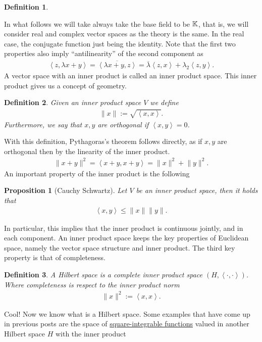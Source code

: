 \documentclass[12pt]{article}
\newtheorem{proposition}{Proposition}
\newtheorem{definition}{Definition}
\newcommand{\br}[1]{\left\langle#1\right\rangle} \newcommand{\set}[1]{\left\{#1\right\}}\newcommand{\qt}[1]{\left(#1\right)} \newcommand{\qp}[1]{\left(#1\right)}\newcommand{\qb}[1]{\left[#1\right]}
\renewcommand{\norm}[1]{\lVert #1 \rVert}\renewcommand{\abs}[1]{\left| #1 \right|}
\begin{document}
\begin{CJK*}{UTF8}{gbsn}
\begin{definition}
	\end{definition}

	In what follows we will take always take the base field to be $\mathbb{K}$, that is, we will consider real and complex vector spaces as the theory is the same. In the real case, the conjugate
	function just being the identity. Note that the first two properties also imply  ``antilinearity'' of the second component as
	\begin{align*}
		\br{z,\lambda x+  y}=\overline{\br{\lambda  x+ y,z}}= \overline{\lambda }\br{z,x}+ \lambda _2\br{z,y}.
	\end{align*}
	A vector space with an inner product is called an inner product space. This inner product gives us a concept of geometry.
	\begin{definition}
		Given an inner product space $V$ we define
		\begin{align*}
			\norm{x}:= \sqrt{\br{x,x}}.
		\end{align*}
		Furthermore, we say that $x,y$ are orthogonal if $\br{x,y}=0$.
	\end{definition}
	With this definition, Pythagoras's theorem follows directly, as if $x,y$ are orthogonal then by the linearity of the inner product.
	\begin{align*}
		\norm{x+y}^2 = \br{x+y,x+y}= \norm{x}^2 +\norm{y}^2.
	\end{align*}
	An important property of the inner product is the following\begin{proposition}[Cauchy Schwartz]\label{CS}
		Let $V$ be an inner product space, then it holds that
		\begin{align*}
			\br{x,y}\leq \norm{x}\norm{y}.
		\end{align*}
	\end{proposition}
	In particular, this implies that the inner product is continuous jointly, and in each component. An inner product space keeps the key properties of Euclidean space, namely the vector space structure and inner product. The third key property is that of completeness.\begin{definition}
		A Hilbert space is a complete inner product space $(H, \br{\cdot ,\cdot })$. Where completeness is respect to the inner product norm
		\begin{align*}
			\norm{x}^2:= \br{x,x}.
		\end{align*}
	\end{definition}
	Cool! Now we know what is a Hilbert space. Some examples that have come up in previous posts are the space of \href{https://nowheredifferentiable.com/2022-05-27-The-Bochner-integral/#:~:text=we%20can%20integrate.-,Our,-next%20definitions%20are}{square-integrable functions} valued in  another Hilbert space $H$ with the inner product

\end{CJK*}
\end{document}
